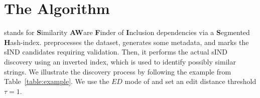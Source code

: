 \section{The \sawfish Algorithm}
\label{section:sind}



\sawfish stands for \textbf{S}imilarity \textbf{AW}are \textbf{F}inder of \textbf{I}nclusion dependencies via a \textbf{S}egmented \textbf{H}ash-index. 
\sawfish preprocesses the dataset, generates some metadata, and marks the sIND candidates requiring validation. Then, it performs the actual sIND discovery using an inverted index, which is used to identify possibly similar strings.
We illustrate the discovery process by following the example from Table~\ref{table:example}.
We use the $ED$ mode of \sawfish and set an edit distance threshold $\tau = 1$.


